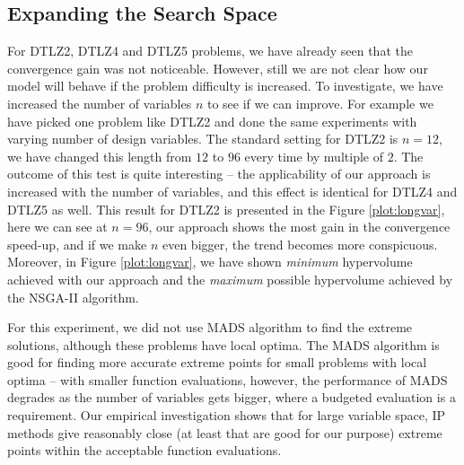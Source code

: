 \documentclass[journal]{IEEEtran}
\begin{document}
\subsection{Expanding the Search Space} 
\label{subsec:longvar}
For DTLZ2, DTLZ4 and DTLZ5 problems, we have already seen that the convergence gain was not noticeable. However, still we are not clear how our model will behave if the problem difficulty is increased. To investigate, we have increased the number of variables \(n\) to see if we can improve. For example we have picked one problem like DTLZ2 and done the same experiments with varying number of design variables. The standard setting for DTLZ2 is \(n = 12\), we have changed this length from \(12\) to \(96\) every time by multiple of \(2\). The outcome of this test is quite interesting -- the applicability of our approach is increased with the number of variables, and this effect is identical for DTLZ4 and DTLZ5 as well. This result for DTLZ2 is presented in the Figure \ref{plot:longvar}, here we can see at \(n = 96\), our approach shows the most gain in the convergence speed-up, and if we make \(n\) even bigger, the trend becomes more conspicuous. Moreover, in Figure \ref{plot:longvar}, we have shown \textit{minimum} hypervolume achieved with our approach and the \textit{maximum} possible hypervolume achieved by the NSGA-II algorithm.

For this experiment, we did not use MADS algorithm to find the extreme solutions, although these problems have local optima. The MADS algorithm is good for finding more accurate extreme points for small problems with local optima -- with smaller function evaluations, however, the performance of MADS degrades as the number of variables gets bigger, where a budgeted evaluation is a requirement. Our empirical investigation shows that for large variable space, IP methods give reasonably close (at least that are good for our purpose) extreme points within the acceptable function evaluations.\vfill
\end{document}
